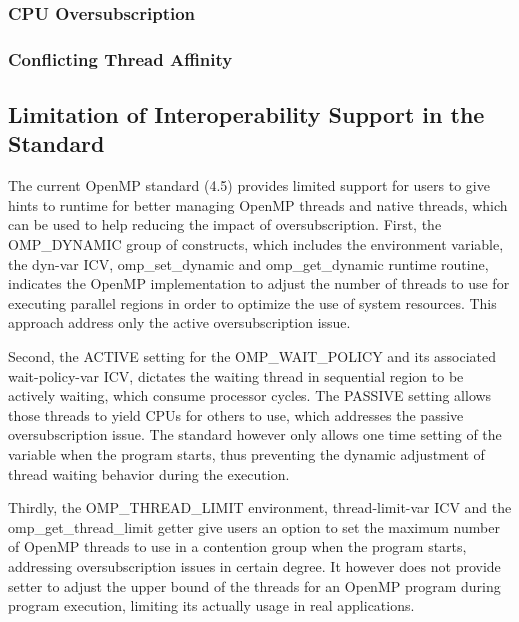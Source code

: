 \subsubsection{CPU Oversubscription}


\subsubsection{Conflicting Thread Affinity}


\subsection{Limitation of Interoperability Support in the Standard}
The current OpenMP standard (4.5) provides limited support for users to give hints to runtime for 
better managing OpenMP threads and native threads, which can be used to help reducing 
the impact of oversubscription.
First, the {\sf OMP\_DYNAMIC} group of constructs, which includes the environment variable, 
the {\sf dyn-var} ICV, {\sf omp\_set\_dynamic} and {\sf omp\_get\_dynamic} runtime routine,
indicates the OpenMP implementation to adjust the number of threads to use for executing parallel
regions in order to optimize the use of system resources. 
This approach address only the active oversubscription issue. 

Second, the {\sf ACTIVE} setting for the {\sf OMP\_WAIT\_POLICY} and its associated {\sf wait-policy-var} ICV, 
dictates the waiting thread in sequential region to be actively waiting, which consume processor cycles.
The {\sf PASSIVE} setting allows those threads to yield CPUs for others to use, which addresses the passive 
oversubscription issue. The standard however only allows one time setting of the variable when the program starts, thus 
preventing the dynamic adjustment of thread waiting behavior during the execution. 

Thirdly, the {\sf OMP\_THREAD\_LIMIT} environment, {\sf thread-limit-var} ICV and the {\sf omp\_get\_thread\_limit} getter give users an option to  
 set the maximum number of OpenMP threads to use in a contention group when the program starts, addressing oversubscription issues in certain
 degree. It however does not provide setter to adjust the upper bound of the threads for an OpenMP program during program execution, limiting
 its actually usage in real applications. 

